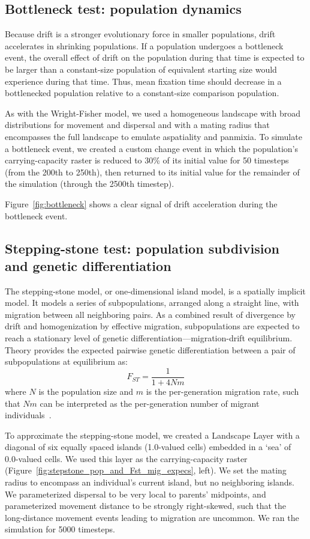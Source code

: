 ﻿\documentclass{article}
\begin{document}
\subsection{Bottleneck test: population dynamics}
Because drift is a stronger evolutionary force in smaller populations,
drift accelerates in shrinking populations. 
If a population undergoes a bottleneck event, the overall effect of drift on the population
during that time is expected to be larger than a constant-size population of equivalent
starting size would experience during that time. 
Thus, mean fixation time should decrease in a bottlenecked population
relative to a constant-size comparison population.

As with the Wright-Fisher model, we used a homogeneous landscape with broad distributions
for movement and dispersal and with a mating radius that encompasses the full landscape
to emulate aspatiality and panmixia. To simulate a bottleneck event,
we created a custom change event in which the population's carrying-capacity raster
is reduced to 30\% of its initial value for 50 timesteps (from the 200th to 250th),
then returned to its initial value for the remainder of the simulation
(through the 2500th timestep).

Figure~\ref{fig:bottleneck} shows a clear signal of drift acceleration during the bottleneck event.


\subsection{Stepping-stone test: population subdivision and genetic differentiation}
The stepping-stone model, or one-dimensional island model, is a spatially implicit model.
It models a series of subpopulations, arranged along a straight line,
with migration between all neighboring pairs.
As a combined result of divergence by drift and homogenization
by effective migration, subpopulations are expected to reach
a stationary level of genetic differentiation---migration-drift equilibrium. 
Theory provides the expected pairwise genetic differentiation
between a pair of subpopulations at equilibrium as:
\begin{equation}
F_{ST} = \frac{1}{1 + 4Nm}
\end{equation}
where $N$ is the population size and $m$ is the per-generation migration rate,
such that $Nm$ can be interpreted as the per-generation number of migrant
individuals~\cite{hartl}.

To approximate the stepping-stone model, we created a Landscape Layer with a diagonal
of six equally spaced islands (1.0-valued cells) embedded in a `sea' of 0.0-valued cells.
We used this layer as the carrying-capacity raster (Figure~\ref{fig:stepstone_pop_and_Fst_mig_expecs}, left).
We set the mating radius to encompass an individual's current island, but no neighboring islands.
We parameterized dispersal to be very local to parents' midpoints, and
parameterized movement distance to be strongly right-skewed, such that
the long-distance movement events leading to migration are uncommon.
We ran the simulation for 5000 timesteps.
\end{document}
